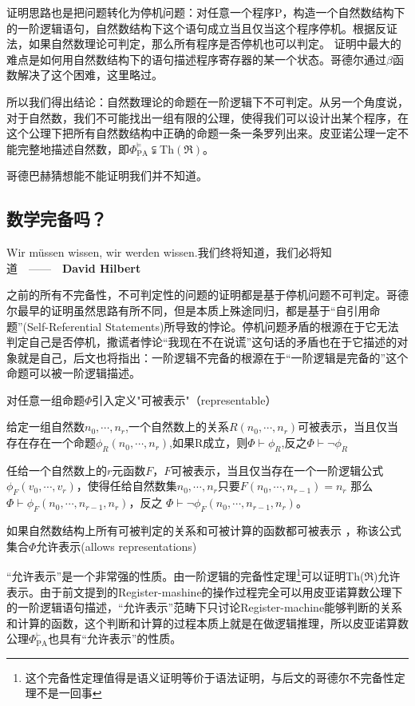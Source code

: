 		 证明思路也是把问题转化为停机问题：对任意一个程序P，构造一个自然数结构下的一阶逻辑语句，自然数结构下这个语句成立当且仅当这个程序停机。根据反证法，如果自然数理论可判定，那么所有程序是否停机也可以判定。
     证明中最大的难点是如何用自然数结构下的语句描述程序寄存器的某一个状态。哥德尔通过$\beta$函数解决了这个困难，这里略过。


		 所以我们得出结论：自然数理论的命题在一阶逻辑下不可判定。从另一个角度说，对于自然数，我们不可能找出一组有限的公理，使得我们可以设计出某个程序，在这个公理下把所有自然数结构中正确的命题一条一条罗列出来。皮亚诺公理一定不能完整地描述自然数，即$\Phi_\text{PA}^{\models} \subsetneqq \text{Th}(\Re)$。

		 哥德巴赫猜想能不能证明我们并不知道。

\subsection{数学完备吗？}


\textsf{Wir müssen wissen, wir werden wissen.我们终将知道，我们必将知道~~------~~{\bf David Hilbert}}%


	   之前的所有不完备性，不可判定性的问题的证明都是基于停机问题不可判定。哥德尔最早的证明虽然思路有所不同，但是本质上殊途同归，都是基于“自引用命题”(Self-Referential Statements)所导致的悖论。停机问题矛盾的根源在于它无法判定自己是否停机，撒谎者悖论“我现在不在说谎”这句话的矛盾也在于它描述的对象就是自己，后文也将指出：一阶逻辑不完备的根源在于“一阶逻辑是完备的”这个命题可以被一阶逻辑描述。

     对任意一组命题$\Phi$引入定义"可被表示"（representable）

		 	   给定一组自然数$n_0,\cdots,n_r$,一个自然数上的关系$R(n_0,\cdots,n_r)$可被表示，当且仅当存在存在一个命题$\phi_R(n_0,\cdots,n_r)$,如果R成立，则$\Phi \vdash \phi_R $,反之$\Phi \vdash \lnot \phi_R $

         任给一个自然数上的$r$元函数$F$，$F$可被表示，当且仅当存在一个一阶逻辑公式$\phi_F(v_0,\cdots,v_r)$，使得任给自然数集$n_0,\cdots,n_r$只要$F(n_0,\cdots,n_{r-1})=n_r$ 那么$\Phi \vdash \phi_F(n_0,\cdots,n_{r-1},n_r)$，反之
				 $\Phi \vdash \lnot \phi_F(n_0,\cdots,n_{r-1},n_r)$。


         如果自然数结构上所有可被判定的关系和可被计算的函数都可被表示
        ，称该公式集合$\Phi$允许表示(allows representations)


			   “允许表示”是一个非常强的性质。由一阶逻辑的完备性定理\footnote{这个完备性定理值得是语义证明等价于语法证明，与后文的哥德尔不完备性定理不是一回事}可以证明Th($\Re$)允许表示。由于前文提到的Register-mashine的操作过程完全可以用皮亚诺算数公理下的一阶逻辑语句描述，“允许表示”范畴下只讨论Register-machine能够判断的关系和计算的函数，这个判断和计算的过程本质上就是在做逻辑推理，所以皮亚诺算数公理$\Phi^{\vdash}_{\text{PA}}$也具有“允许表示”的性质。



